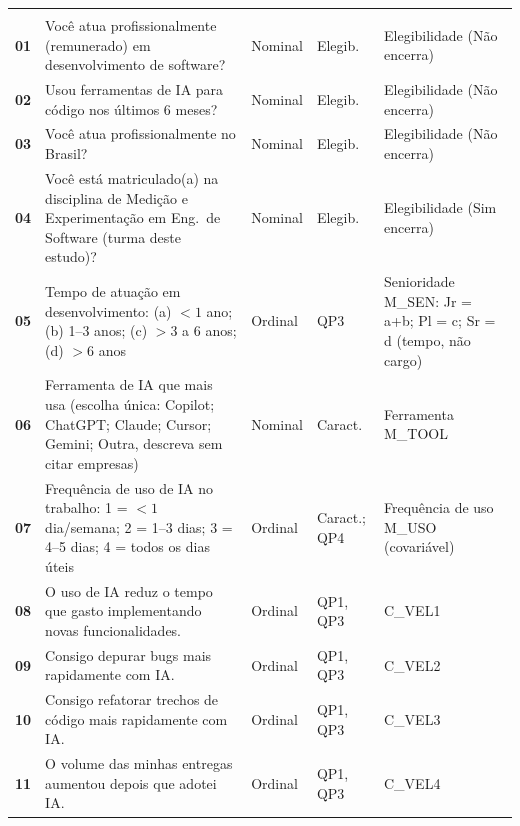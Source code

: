{\footnotesize
{}
\renewcommand{\arraystretch}{1.35}
\setlength{\tabcolsep}{4.5pt}
\begin{longtable}{|L{0.55cm}|L{7.35cm}|L{1.85cm}|L{1.65cm}|L{4.25cm}|}
\hline
{}
 &  &  &  &  \\
\hline
\endfirsthead
\hline
{}
 &  &  &  &  \\
\hline
\endhead
\hline
\endfoot
\textbf{01} & Você atua profissionalmente (remunerado) em desenvolvimento de software? & Nominal & Elegib. & Elegibilidade (Não encerra) \\ \hline
\textbf{02} & Usou ferramentas de IA para código nos últimos 6 meses? & Nominal & Elegib. & Elegibilidade (Não encerra) \\ \hline
\textbf{03} & Você atua profissionalmente no Brasil? & Nominal & Elegib. & Elegibilidade (Não encerra) \\ \hline
\textbf{04} & Você está matriculado(a) na disciplina de Medição e Experimentação em Eng.\ de Software (turma deste estudo)? & Nominal & Elegib. & Elegibilidade (Sim encerra) \\ \hline
\textbf{05} & Tempo de atuação em desenvolvimento: (a) $< 1$ ano; (b) 1--3 anos; (c) $> 3$ a 6 anos; (d) $> 6$ anos & Ordinal & QP3 & Senioridade M\_SEN: Jr = a+b; Pl = c; Sr = d (tempo, não cargo) \\ \hline
\textbf{06} & Ferramenta de IA que mais usa (escolha única: Copilot; ChatGPT; Claude; Cursor; Gemini; Outra, descreva sem citar empresas) & Nominal & Caract. & Ferramenta M\_TOOL \\ \hline
\textbf{07} & Frequência de uso de IA no trabalho: 1 = $< 1$ dia/semana; 2 = 1--3 dias; 3 = 4--5 dias; 4 = todos os dias úteis & Ordinal & Caract.; QP4 & Frequência de uso M\_USO (covariável) \\ \hline
\textbf{08} & O uso de IA reduz o tempo que gasto implementando novas funcionalidades. & Ordinal & QP1, QP3 & C\_VEL1 \\ \hline
\textbf{09} & Consigo depurar bugs mais rapidamente com IA. & Ordinal & QP1, QP3 & C\_VEL2 \\ \hline
\textbf{10} & Consigo refatorar trechos de código mais rapidamente com IA. & Ordinal & QP1, QP3 & C\_VEL3 \\ \hline
\textbf{11} & O volume das minhas entregas aumentou depois que adotei IA. & Ordinal & QP1, QP3 & C\_VEL4 \\ \hline

\end{longtable}}
